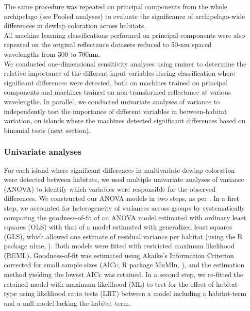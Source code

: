 The same procedure was repeated on principal components from the whole archipelago (see Pooled analyses) to evaluate the significance of archipelago-wide differences in dewlap coloration across habitats.\\ 

All machine learning classifications performed on principal components were also repeated on the original reflectance datasets reduced to 50-nm spaced wavelengths from 300 to 700nm.\\

We conducted one-dimensional sensitivity analyses using rminer \citep{Cortez2013} to determine the relative importance of the different input variables during classification where significant differences were detected, both on machines trained on principal components and machines trained on non-transformed reflectance at various wavelengths. In parallel, we conducted univariate analyses of variance to independently test the importance of different variables in between-habitat variation, on islands where the machines detected significant differences based on binomial tests (next section).

\subsubsection*{Univariate analyses}

For each island where significant differences in multivariate dewlap coloration were detected between habitats, we used multiple univariate analyses of variance (ANOVA) to identify which variables were responsible for the observed differences. We constructed our ANOVA models in two steps, as per \citet{Zuur2009}. In a first step, we accounted for heterogeneity of variances across groups by systematically comparing the goodness-of-fit of an ANOVA model estimated with ordinary least squares (OLS) with that of a model estimated with generalized least squares (GLS), which allowed one estimate of residual variance per habitat (using the R package nlme, \citealt{Pinheiro2000, Pinheiro2020}). Both models were fitted with restricted maximum likelihood (REML). Goodness-of-fit was estimated using Akaike's Information Criterion corrected for small sample sizes (AICc, R package MuMIn, \citealt{Barton2019}), and the estimation method yielding the lowest AICc was retained. In a second step, we re-fitted the retained model with maximum likelihood (ML) to test for the effect of habitat-type using likelihood ratio tests (LRT) between a model including a habitat-term and a null model lacking the habitat-term.\\

